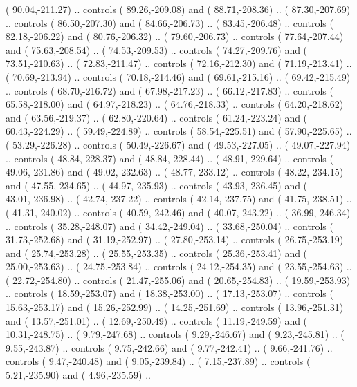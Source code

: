 {        (  90.04,-211.27) .. controls (  89.26,-209.08) and (  88.71,-208.36) ..
        (  87.30,-207.69) .. controls (  86.50,-207.30) and (  84.66,-206.73) ..
        (  83.45,-206.48) .. controls (  82.18,-206.22) and (  80.76,-206.32) ..
        (  79.60,-206.73) .. controls (  77.64,-207.44) and (  75.63,-208.54) ..
        (  74.53,-209.53) .. controls (  74.27,-209.76) and (  73.51,-210.63) ..
        (  72.83,-211.47) .. controls (  72.16,-212.30) and (  71.19,-213.41) ..
        (  70.69,-213.94) .. controls (  70.18,-214.46) and (  69.61,-215.16) ..
        (  69.42,-215.49) .. controls (  68.70,-216.72) and (  67.98,-217.23) ..
        (  66.12,-217.83) .. controls (  65.58,-218.00) and (  64.97,-218.23) ..
        (  64.76,-218.33) .. controls (  64.20,-218.62) and (  63.56,-219.37) ..
        (  62.80,-220.64) .. controls (  61.24,-223.24) and (  60.43,-224.29) ..
        (  59.49,-224.89) .. controls (  58.54,-225.51) and (  57.90,-225.65) ..
        (  53.29,-226.28) .. controls (  50.49,-226.67) and (  49.53,-227.05) ..
        (  49.07,-227.94) .. controls (  48.84,-228.37) and (  48.84,-228.44) ..
        (  48.91,-229.64) .. controls (  49.06,-231.86) and (  49.02,-232.63) ..
        (  48.77,-233.12) .. controls (  48.22,-234.15) and (  47.55,-234.65) ..
        (  44.97,-235.93) .. controls (  43.93,-236.45) and (  43.01,-236.98) ..
        (  42.74,-237.22) .. controls (  42.14,-237.75) and (  41.75,-238.51) ..
        (  41.31,-240.02) .. controls (  40.59,-242.46) and (  40.07,-243.22) ..
        (  36.99,-246.34) .. controls (  35.28,-248.07) and (  34.42,-249.04) ..
        (  33.68,-250.04) .. controls (  31.73,-252.68) and (  31.19,-252.97) ..
        (  27.80,-253.14) .. controls (  26.75,-253.19) and (  25.74,-253.28) ..
        (  25.55,-253.35) .. controls (  25.36,-253.41) and (  25.00,-253.63) ..
        (  24.75,-253.84) .. controls (  24.12,-254.35) and (  23.55,-254.63) ..
        (  22.72,-254.80) .. controls (  21.47,-255.06) and (  20.65,-254.83) ..
        (  19.59,-253.93) .. controls (  18.59,-253.07) and (  18.38,-253.00) ..
        (  17.13,-253.07) .. controls (  15.63,-253.17) and (  15.26,-252.99) ..
        (  14.25,-251.69) .. controls (  13.96,-251.31) and (  13.57,-251.01) ..
        (  12.69,-250.49) .. controls (  11.19,-249.59) and (  10.31,-248.75) ..
        (   9.79,-247.68) .. controls (   9.29,-246.67) and (   9.23,-245.81) ..
        (   9.55,-243.87) .. controls (   9.75,-242.66) and (   9.77,-242.41) ..
        (   9.66,-241.76) .. controls (   9.47,-240.48) and (   9.05,-239.84) ..
        (   7.15,-237.89) .. controls (   5.21,-235.90) and (   4.96,-235.59) ..
}
